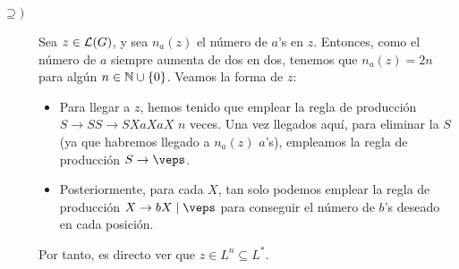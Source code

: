 \begin{ejercicio}
\begin{enumerate}
\begin{description}
            \item[$\supseteq)$] Sea $z\in\mathcal{L}(G)$, y sea $n_a(z)$ el número de $a$'s en $z$. Entonces, como el número de $a$ siempre aumenta de dos en dos, tenemos que $n_a(z)=2n$ para algún $n\in \mathbb{N}\cup \{0\}$.
            Veamos la forma de $z$:
            \begin{itemize}
                \item Para llegar a $z$, hemos tenido que emplear la regla de producción $S \rightarrow SS\rightarrow SXaXaX$ $n$ veces. Una vez llegados aquí, para eliminar la $S$ (ya que habremos llegado a $n_a(z)$ $a$'s), empleamos la regla de producción $S\rightarrow \veps$.
                \item Posteriormente, para cada $X$, tan solo podemos emplear la regla de producción $X\rightarrow bX \mid \veps$ para conseguir el número de $b$'s deseado en cada posición.
            \end{itemize}
            Por tanto, es directo ver que $z\in L^n\subseteq L^\ast$.
        \end{description}
    \end{enumerate}
\end{ejercicio}



